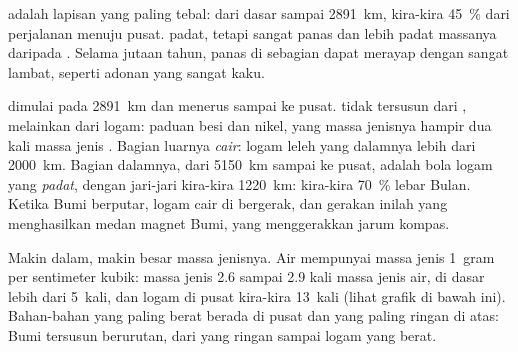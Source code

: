 \textbf{} adalah lapisan yang paling tebal: dari dasar  sampai
2891~km, kira-kira 45~\% dari perjalanan menuju pusat.  padat,
tetapi sangat panas dan lebih padat massanya daripada  . Selama
jutaan tahun,  panas di sebagian  dapat merayap dengan sangat
lambat, seperti adonan yang sangat kaku.

\textbf{} dimulai pada 2891~km dan menerus sampai ke pusat.  tidak
tersusun dari , melainkan dari logam: paduan besi dan nikel, yang
massa jenisnya hampir dua kali massa jenis . Bagian luarnya
\emph{cair}:  logam leleh yang dalamnya lebih dari 2000~km. Bagian
dalamnya, dari 5150~km sampai ke pusat, adalah bola logam yang
\emph{padat}, dengan jari-jari kira-kira 1220~km: kira-kira 70~\% lebar
Bulan. Ketika Bumi berputar, logam cair di  bergerak, dan gerakan
inilah yang menghasilkan medan magnet Bumi, yang menggerakkan jarum
kompas.

Makin dalam, makin besar massa jenisnya. Air mempunyai massa jenis 1~gram
per sentimeter kubik: massa jenis   2.6 sampai 2.9 kali massa
jenis air,  di dasar  lebih dari 5~kali, dan logam di pusat
kira-kira 13~kali (lihat grafik di bawah ini). Bahan-bahan yang paling
berat berada di pusat dan yang paling ringan di atas: Bumi tersusun
berurutan, dari  yang ringan sampai  logam yang berat.


